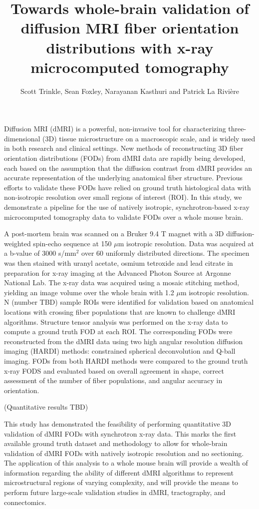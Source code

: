 \documentclass[11pt]{article}
\title{Towards whole-brain validation of diffusion MRI fiber orientation
  distributions with x-ray microcomputed tomography}
\author{Scott Trinkle, Sean
  Foxley, Narayanan Kasthuri and Patrick La Rivi\`ere}
\date{}
\begin{document}
\maketitle

Diffusion MRI (dMRI) is a powerful, non-invasive tool for characterizing
three-dimensional (3D) tissue microstructure on a macroscopic scale, and is
widely used in both research and clinical settings. New methods of
reconstructing 3D fiber orientation distributions (FODs) from dMRI data are
rapidly being developed, each based on the assumption that the diffusion
contrast from dMRI provides an accurate representation of the underlying
anatomical fiber structure. Previous efforts to validate these FODs have relied
on ground truth histological data with non-isotropic resolution over small
regions of interest (ROI). In this study, we demonstrate a pipeline for the use
of natively isotropic, synchrotron-based x-ray microcomputed tomography data to
validate FODs over a whole mouse brain.

A post-mortem brain was scanned on a Bruker 9.4 T magnet with a 3D
diffusion-weighted spin-echo sequence at 150 $\mu\text{m}$ isotropic
resolution. Data was acquired at a b-value of 3000 s/mm$^2$ over 60 uniformly
distributed directions. The specimen was then stained with uranyl acetate,
osmium tetroxide and lead citrate in preparation for x-ray imaging at the
Advanced Photon Source at Argonne National Lab. The x-ray data was acquired
using a mosaic stitching method, yielding an image volume over the whole brain
with 1.2 $\mu$m isotropic resolution. N (number TBD) sample ROIs were identified
for validation based on anatomical locations with crossing fiber populations
that are known to challenge dMRI algorithms. Structure tensor analysis was
performed on the x-ray data to compute a ground truth FOD at each ROI. The
corresponding FODs were reconstructed from the dMRI data using two high angular
resolution diffusion imaging (HARDI) methods: constrained spherical
deconvolution and Q-ball imaging. FODs from both HARDI methods were compared to the
ground truth x-ray FODS and evaluated based on overall agreement in shape,
correct assessment of the number of fiber populations, and angular accuracy in
orientation.

(Quantitative results TBD)

This study has demonstrated the feasibility of performing quantitative 3D
validation of dMRI FODs with synchrotron x-ray data. This marks the first
available ground truth dataset and methodology to allow for whole-brain
validation of dMRI FODs with natively isotropic resolution and no sectioning. The
application of this analysis to a whole mouse brain will provide a wealth of
information regarding the ability of different dMRI algorithms to represent
microstructural regions of varying complexity, and will provide the means to
perform future large-scale validation studies in dMRI, tractography, and
connectomics. 
\end{document}
